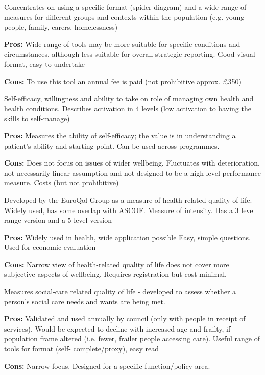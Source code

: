 \begin{tcolorbox}[colback={boxcolour},title={Outcomes Stars (wide range)}]
    Concentrates on using a specific format (spider diagram) and a wide range of measures for different groups and contexts within the population (e.g. young people, family, carers, homelessness)

    {\bf Pros:} Wide range of tools may be more suitable for specific conditions and circumstances, although less suitable for overall strategic reporting. Good visual format, easy to undertake

    {\bf Cons:} To use this tool an annual fee is paid (not prohibitive approx. £350)
\end{tcolorbox}

\begin{tcolorbox}[colback={boxcolour},title={Patient Activation Measure (PAM)}]
    Self-efficacy, willingness and ability to take on role of managing own health and health conditions. Describes activation in 4 levels (low activation to having the skills to self-manage)

    {\bf Pros:} Measures the ability of self-efficacy; the value is in understanding a patient's ability and starting point. Can be used across programmes.

    {\bf Cons:} Does not focus on issues of wider wellbeing. Fluctuates with deterioration, not necessarily linear assumption and not designed to be a high level performance measure. Costs (but not prohibitive)
\end{tcolorbox}

\begin{tcolorbox}[colback={boxcolour},title={EQ-5D}]
    Developed by the EuroQol Group as a measure of health-related quality of life. Widely used, has some overlap with ASCOF. Measure of intensity. Has a 3 level range version and a 5 level version
    
    {\bf Pros:} Widely used in health, wide application possible Easy, simple questions. Used for economic evaluation
    
    {\bf Cons:} Narrow view of health-related quality of life does not cover more subjective aspects of wellbeing. Requires registration but cost minimal.
\end{tcolorbox}

\begin{tcolorbox}[colback={boxcolour},title={ASCOF}]
    Measures social-care related quality of life - developed to assess whether a person's social care needs and wants are being met.
    
    {\bf Pros:} Validated and used annually by council (only with people in receipt of services). Would be expected to decline with increased age and frailty, if population frame altered (i.e. fewer, frailer people accessing care). Useful range of tools for format (self- complete/proxy), easy read
    
    {\bf Cons:} Narrow focus. Designed for a specific function/policy area.
\end{tcolorbox}


